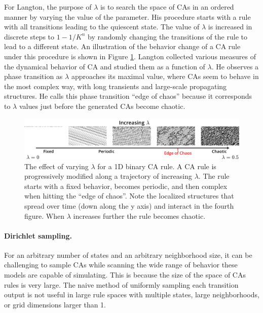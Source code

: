 For Langton, the purpose of $\lambda$ is to search the space of \acp{CA} in an ordered
manner by varying the value of the parameter. His procedure starts with a rule
with all transitions leading to the quiescent state. The value of $\lambda$ is
increased in discrete steps to $1 - 1 / K^{n}$ by randomly changing the
transitions of the rule to lead to a different state. An illustration of the
behavior change of a \ac{CA} rule under this procedure is shown in Figure
\ref{fig:langton_lambda}. Langton collected various measures of the dynamical
behavior of \ac{CA} and studied them as a function of $\lambda$. He observes a phase
transition as $\lambda$ approaches its maximal value, where \acp{CA} seem to behave
in the most complex way, with long transients and large-scale propagating
structures. He calls this phase transition ``edge of chaos'' because it
corresponds to $\lambda$ values just before the generated \acp{CA} become
chaotic.

\begin{figure}[htbp]
  \centering
  \includegraphics[width=\linewidth]{figures/langton_lambda.pdf}
  \caption{The effect of varying $\lambda$ for a 1D binary \ac{CA} rule. A \ac{CA}
    rule is progressively modified along a trajectory of increasing $\lambda$. The
    rule starts with a fixed behavior, becomes periodic, and then complex when
    hitting the ``edge of chaos''. Note the localized structures that spread
    over time (down along the y axis) and interact in the fourth figure. When
    $\lambda$ increases further the rule becomes chaotic.}
  \label{fig:langton_lambda}
\end{figure}

\paragraph{Dirichlet sampling.}
For an arbitrary number of states and an arbitrary neighborhood size, it can be
challenging to sample \acp{CA} while scanning the wide range of behavior these
models are capable of simulating. This is because the size of the space of
\acp{CA} rules is very large. The naive method of uniformly sampling each
transition output is not useful in large rule spaces with multiple states, large
neighborhoods, or grid dimensions larger than 1.

